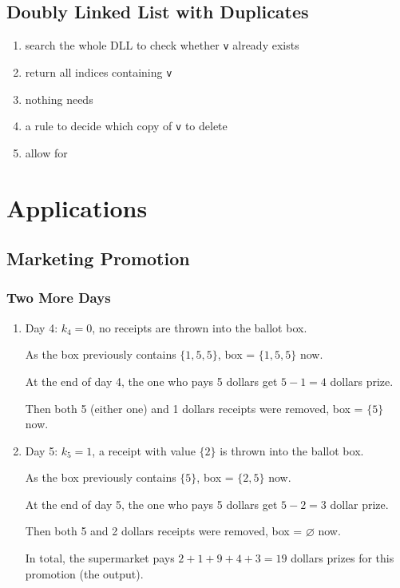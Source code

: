 \documentclass[12pt]{article}
\renewcommand{\t}{\texttt}
\begin{document}
\subsection{Doubly Linked List with Duplicates}
\begin{enumerate}
\item search the whole DLL to check whether \t{v} already exists
\item return all indices containing \t{v}
\item nothing needs
\item a rule to decide which copy of \t{v} to delete
\item allow for
\end{enumerate}
\section{Applications}
\subsection{Marketing Promotion}
\subsubsection{Two More Days}
\begin{enumerate}
\item Day 4: $k_4=0$, no receipts are thrown into the ballot box.

As the box previously contains $\{1, 5, 5\}$, box = $\{1, 5, 5\}$ now.

At the end of day 4, the one who pays 5 dollars get $5-1=4$ dollars prize.

Then both 5 (either one) and 1 dollars receipts were removed, box = $\{5\}$ now.
\item Day 5: $k_5=1$, a receipt with value $\{2\}$ is thrown into the ballot box.

As the box previously contains $\{5\}$, box = $\{2, 5\}$ now.

At the end of day 5, the one who pays 5 dollars get $5-2=3$ dollar prize.

Then both 5 and 2 dollars receipts were removed, box = $\varnothing$ now.

In total, the supermarket pays $2+1+9+4+3=19$ dollars prizes for this promotion (the output).
\end{enumerate}
\end{document}
